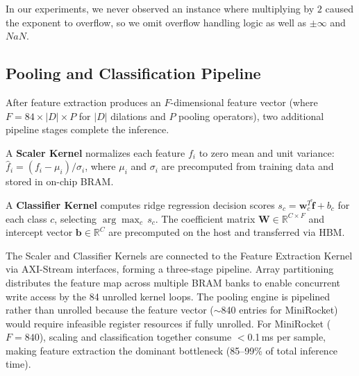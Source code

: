 In our experiments, we never observed an instance where multiplying by $2$ caused the exponent to overflow, so we omit overflow handling logic as well as $\pm \infty$ and $NaN$.

\subsection{Pooling and Classification Pipeline}
\label{sec:classification}

After feature extraction produces an $F$-dimensional feature vector (where $F = 84 \times |D| \times P$ for $|D|$ dilations and $P$ pooling operators), two additional pipeline stages complete the inference.

A \textbf{Scaler Kernel} normalizes each feature $f_i$ to zero mean and unit variance: $\hat{f}_i = (f_i - \mu_i) / \sigma_i$, where $\mu_i$ and $\sigma_i$ are precomputed from training data and stored in on-chip BRAM.

A \textbf{Classifier Kernel} computes ridge regression decision scores $s_c = \mathbf{w}_c^T \hat{\mathbf{f}} + b_c$ for each class $c$, selecting $\arg\max_c\, s_c$. The coefficient matrix $\mathbf{W} \in \mathbb{R}^{C \times F}$ and intercept vector $\mathbf{b} \in \mathbb{R}^C$ are precomputed on the host and transferred via HBM.

The Scaler and Classifier Kernels are connected to the Feature Extraction Kernel via AXI-Stream interfaces, forming a three-stage pipeline. Array partitioning distributes the feature map across multiple BRAM banks to enable concurrent write access by the 84 unrolled kernel loops. The pooling engine is pipelined rather than unrolled because the feature vector ($\sim$840 entries for MiniRocket) would require infeasible register resources if fully unrolled. For MiniRocket ($F = 840$), scaling and classification together consume $<$0.1\,ms per sample, making feature extraction the dominant bottleneck (85--99\% of total inference time).

